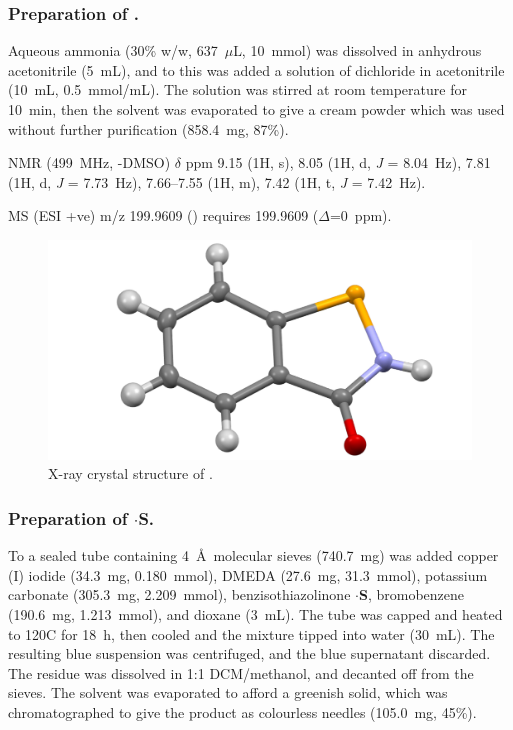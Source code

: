 \begin{refsection}
\subsubsection{Preparation of .}
Aqueous ammonia (30\% w/w, 637~$\mu$L, 10~mmol) was dissolved in anhydrous acetonitrile (5~mL), and to this was added a solution of dichloride  in acetonitrile (10~mL, 0.5~mmol/mL).
The solution was stirred at room temperature for 10~min, then the solvent was evaporated to give a cream powder which was used without further purification (858.4~mg, 87\%).

 NMR (499~MHz, -DMSO) $\delta$ ppm 9.15 (1H, s), 8.05 (1H, d, \emph{J} = 8.04~Hz), 7.81 (1H, d, \emph{J} = 7.73~Hz), 7.66--7.55 (1H, m), 7.42 (1H, t, \emph{J} = 7.42~Hz).

MS (ESI +ve) m/z 199.9609 ()  requires 199.9609 ($\Delta$=0~ppm).

\begin{figure}
    \includegraphics[width=0.8\linewidth]{Figures/ebs-h-xtal.pdf}
    \caption{X-ray crystal structure of .}
\end{figure}

\subsubsection{Preparation of \texorpdfstring{$\cdot$\textbf{S}}{.S}.}
To a sealed tube containing 4~\AA\ molecular sieves (740.7~mg) was added copper (I) iodide (34.3~mg, 0.180~mmol), DMEDA (27.6~mg, 31.3~mmol), potassium carbonate (305.3~mg, 2.209~mmol), benzisothiazolinone $\cdot$\textbf{S}, bromobenzene (190.6~mg, 1.213~mmol), and dioxane (3~mL).
The tube was capped and heated to 120\degree{}C for 18~h, then cooled and the mixture tipped into water (30~mL). The resulting blue suspension was centrifuged, and the blue supernatant discarded. The residue was dissolved in 1:1 DCM/methanol, and decanted off from the sieves.
The solvent was evaporated to afford a greenish solid, which was chromatographed to give the product as colourless needles (105.0~mg, 45\%).


\end{refsection}
